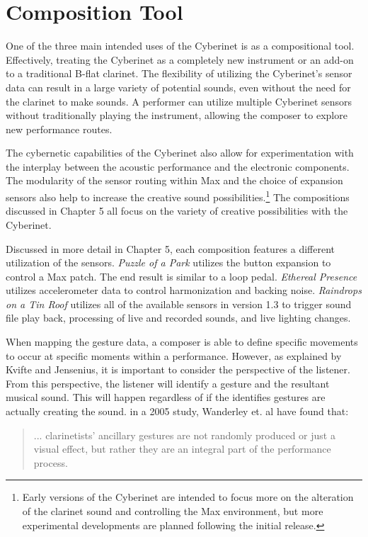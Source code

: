\section{Composition Tool}
One of the three main intended uses of the Cyberinet is as a compositional tool. Effectively, treating the Cyberinet as a completely new instrument or an add-on to a traditional B-flat clarinet. The flexibility of utilizing the Cyberinet's sensor data can result in a large variety of potential sounds, even without the need for the clarinet to make sounds. A performer can utilize multiple Cyberinet sensors without traditionally playing the instrument, allowing the composer to explore new performance routes.

The cybernetic capabilities of the Cyberinet also allow for experimentation with the interplay between the acoustic performance and the electronic components. The modularity of the sensor routing within Max and the choice of expansion sensors also help to increase the creative sound possibilities.\footnote{Early versions of the Cyberinet are intended to focus more on the alteration of the clarinet sound and controlling the Max environment, but more experimental developments are planned following the initial release.} The compositions discussed in Chapter 5 all focus on the variety of creative possibilities with the Cyberinet. 

Discussed in more detail in Chapter 5, each composition features a different utilization of the sensors. \textit{Puzzle of a Park} utilizes the button expansion to control a Max patch. The end result is similar to a loop pedal. \textit{Ethereal Presence} utilizes accelerometer data to control harmonization and backing noise. \textit{Raindrops on a Tin Roof} utilizes all of the available sensors in version 1.3 to trigger sound file play back, processing of live and recorded sounds, and live lighting changes.

When mapping the gesture data, a composer is able to define specific movements to occur at specific moments within a performance. However, as explained by Kvifte and Jensenius, it is important to consider the perspective of the listener\cite{KvifteJenseniusDescription}. From this perspective, the listener will identify a gesture and the resultant musical sound. This will happen regardless of if the identifies gestures are actually creating the sound. in a 2005 study, Wanderley et. al have found that:

\begin{quote}
    ... clarinetists' ancillary gestures are not randomly produced or just a visual effect, but rather they are an integral part of the performance process\cite{wanderleyClarinetGesture2005}.
\end{quote}

